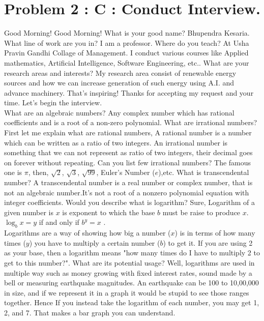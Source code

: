 \documentclass{article}
\begin{document}
\section{Problem 2 : C : Conduct Interview.}
\begin{description}
\me Good Morning!
\prof Good Morning!
\me What is your good name?
\prof Bhupendra Kesaria.
\me What line of work are you in?
\prof I am a professor. 
\me Where do you teach?
\prof At Usha Pravin Gandhi Collage of Management. I conduct various courses like Applied mathematics, Artificial Intelligence, Software Engineering, etc..
\me What are your research areas and interests?
\prof My research area consist of renewable energy sources and how we can increase generation of such energy using A.I. and advance machinery.
\me That's inspiring! Thanks for accepting my request and your time. Let's begin the interview. \\
What are an algebraic numbers?
\prof Any complex number which has rational coefficients and is a root of a non-zero polynomial.
\me What are irrational numbers?
\prof First let me explain what are rational numbers, A rational number is a number which can be written as a ratio of two integers. An irrational number is something that we can not represent as ratio of two integers, their decimal goes on forever without repeating.
\me Can you list few irrational numbers?
\prof The famous one is $\pi$, then, $\sqrt{2}$, $\sqrt{3}$, $\sqrt{99}$, Euler's Number ($e$),etc.
\me What is transcendental number?
\prof A transcendental number is a real number or complex number, that is not an algebraic number.It's not a root of a nonzero polynomial equation with integer coefficients.
\me Would you describe what is logarithm?
\prof Sure, Logarithm of a given number is $x$ is exponent to which the base $b$ must be raise to produce $x$. \\
$\log_b{x} = y$ if and only if $b^y = x$ . \\
Logarithms are a way of showing how big a number ($x$) is in terms of how many times ($y$) you have to multiply a certain number ($b$) to get it. If you are using 2 as your base, then a logarithm means "how many times do I have to multiply 2 to get to this number?".
\me What are its potential usage?
\prof Well, logarithms are used in multiple way such as money growing with fixed interest rates, sound made by a bell or measuring earthquake magnitudes. An earthquake can be 100 to 10,00,000 in size, and if we represent it in a graph it would be stupid to see those ranges together. Hence If you instead take the logarithm of each number, you may get 1, 2, and 7. That makes a bar graph you can understand.

\end{description}
\end{document}
